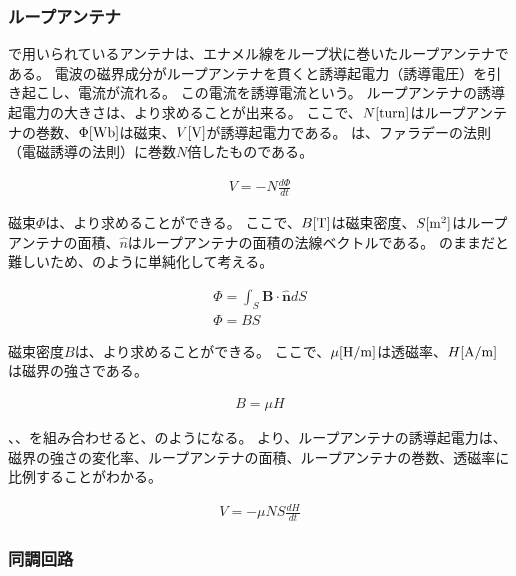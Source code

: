 \documentclass[report.tex]{subfiles}
\begin{document}
\subsubsection{ループアンテナ}

で用いられているアンテナは、エナメル線をループ状に巻いたループアンテナである。
電波の磁界成分がループアンテナを貫くと誘導起電力（誘導電圧）を引き起こし、電流が流れる\cite{ラジオ}。
この電流を誘導電流という。
ループアンテナの誘導起電力の大きさは、より求めることが出来る。
ここで、\(N[\rm{turn}]\)はループアンテナの巻数、\(\Phi[\rm{Wb}]\)は磁束、\(V[\rm{V}]\)が誘導起電力である。
は、ファラデーの法則（電磁誘導の法則）に巻数\(N\)倍したものである\cite{やくにたつ}。

\begin{align}
	V = -N \frac{d\Phi}{dt} \label{eq:induced-voltage}
\end{align}

磁束\(\Phi\)は、より求めることができる\cite{電磁気学}。
ここで、\(B[\rm{T}]\)は磁束密度、\(S[\rm{m^2}]\)はループアンテナの面積、\(\hat{n}\)はループアンテナの面積の法線ベクトルである。
のままだと難しいため、のように単純化して考える。

\begin{align}
	\Phi = \int_S \textbf{B} \cdot \hat{\textbf{n}} dS \label{eq:flux} \\
	\Phi = B S \label{eq:flux2}
\end{align}

磁束密度\(B\)は、より求めることができる。
ここで、\(\mu[\rm{H/m}]\)は透磁率、\(H[\rm{A/m}]\)は磁界の強さである\cite{やくにたつ}。

\begin{align}
	B = \mu H \label{eq:flux-density}
\end{align}

、、を組み合わせると、のようになる。
より、ループアンテナの誘導起電力は、磁界の強さの変化率、ループアンテナの面積、ループアンテナの巻数、透磁率に比例することがわかる。

\begin{align}
	V = -\mu N S \frac{dH}{dt} \label{eq:induced-voltage2}
\end{align}

\subsubsection{同調回路}
\end{document}
